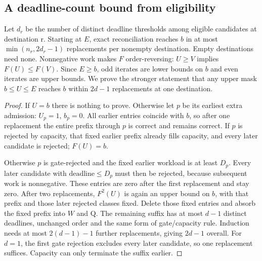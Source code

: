 \documentclass[11pt,a4paper]{article}
\begin{document}
\subsection{A deadline-count bound from eligibility}\label{sec:C.3}

Let $d_r$ be the number of distinct deadline thresholds among eligible candidates at destination r. Starting at $E$, exact reconciliation reaches $b$ in at most $\min(n_r,2d_r-1)$ replacements per nonempty destination. Empty destinations need none. Nonnegative work makes $F$ order-reversing: $U\geq V$ implies $F(U)\leq F(V)$. Since $E\geq b$, odd iterates are lower bounds on $b$ and even iterates are upper bounds. We prove the stronger statement that any upper mask $b\leq U\leq E$ reaches $b$ within $2d-1$ replacements at one destination.

\begin{proof}

If $U=b$ there is nothing to prove. Otherwise let $p$ be its earliest extra admission: $U_p=1$, $b_p=0$. All earlier entries coincide with $b$, so after one replacement the entire prefix through $p$ is correct and remains correct. If $p$ is rejected by capacity, that fixed earlier prefix already fills capacity, and every later candidate is rejected; $F(U)=b$.

Otherwise $p$ is gate-rejected and the fixed earlier workload is at least $D_p$. Every later candidate with $\text{deadline}\leq D_p$ must then be rejected, because subsequent work is nonnegative. These entries are zero after the first replacement and stay zero. After two replacements, $F^{2}(U)$ is again an upper bound on $b$, with that prefix and those later rejected classes fixed. Delete those fixed entries and absorb the fixed prefix into $W$ and Q. The remaining suffix has at most $d-1$ distinct deadlines, unchanged order and the same form of gate/capacity rule. Induction needs at most $2(d-1)-1$ further replacements, giving $2d-1$ overall. For $d=1$, the first gate rejection excludes every later candidate, so one replacement suffices. Capacity can only terminate the suffix earlier.

\end{proof}
\end{document}
